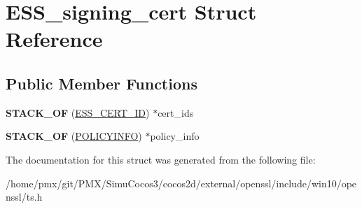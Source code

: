 \hypertarget{structESS__signing__cert}{}\section{E\+S\+S\+\_\+signing\+\_\+cert Struct Reference}
\label{structESS__signing__cert}
\subsection*{Public Member Functions}
\begin{DoxyCompactItemize}
\item 
\mbox{\label{structESS__signing__cert_a9d02849ef4a7fb6c6e1b80af67af826e}} 
{\bfseries S\+T\+A\+C\+K\+\_\+\+OF} (\hyperlink{structESS__cert__id}{E\+S\+S\+\_\+\+C\+E\+R\+T\+\_\+\+ID}) $\ast$cert\+\_\+ids
\item 
\mbox{\label{structESS__signing__cert_a6ae86b6dc193da0e12852f312547ef5d}} 
{\bfseries S\+T\+A\+C\+K\+\_\+\+OF} (\hyperlink{structPOLICYINFO__st}{P\+O\+L\+I\+C\+Y\+I\+N\+FO}) $\ast$policy\+\_\+info
\end{DoxyCompactItemize}


The documentation for this struct was generated from the following file\+:\begin{DoxyCompactItemize}
\item 
/home/pmx/git/\+P\+M\+X/\+Simu\+Cocos3/cocos2d/external/openssl/include/win10/openssl/ts.\+h\end{DoxyCompactItemize}
